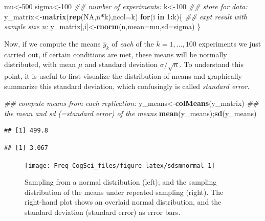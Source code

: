\documentclass[12pt,]{krantz}
\newenvironment{Shaded}{\begin{snugshade}}{\end{snugshade}}
\newcommand{\CommentTok}[1]{\textcolor[rgb]{0.56,0.35,0.01}{\textit{#1}}}
\newcommand{\ControlFlowTok}[1]{\textcolor[rgb]{0.13,0.29,0.53}{\textbf{#1}}}
\newcommand{\DataTypeTok}[1]{\textcolor[rgb]{0.13,0.29,0.53}{#1}}
\newcommand{\DecValTok}[1]{\textcolor[rgb]{0.00,0.00,0.81}{#1}}
\newcommand{\KeywordTok}[1]{\textcolor[rgb]{0.13,0.29,0.53}{\textbf{#1}}}
\newcommand{\NormalTok}[1]{#1}
\newcommand{\OperatorTok}[1]{\textcolor[rgb]{0.81,0.36,0.00}{\textbf{#1}}}
\newcommand{\OtherTok}[1]{\textcolor[rgb]{0.56,0.35,0.01}{#1}}
\begin{document}
\begin{Shaded}
\begin{Highlighting}[]
\NormalTok{mu<-}\DecValTok{500}
\NormalTok{sigma<-}\DecValTok{100}
\CommentTok{## number of experiments:}
\NormalTok{k<-}\DecValTok{100}
\CommentTok{## store for data:}
\NormalTok{y_matrix<-}\KeywordTok{matrix}\NormalTok{(}\KeywordTok{rep}\NormalTok{(}\OtherTok{NA}\NormalTok{,n}\OperatorTok{*}\NormalTok{k),}\DataTypeTok{ncol=}\NormalTok{k)}
\ControlFlowTok{for}\NormalTok{(i }\ControlFlowTok{in} \DecValTok{1}\OperatorTok{:}\NormalTok{k)\{}
  \CommentTok{## expt result with sample size n:}
\NormalTok{  y_matrix[,i]<-}\KeywordTok{rnorm}\NormalTok{(n,}\DataTypeTok{mean=}\NormalTok{mu,}\DataTypeTok{sd=}\NormalTok{sigma)}
\NormalTok{\}}
\end{Highlighting}
\end{Shaded}

Now, if we compute the means \(\bar{y}_k\) of \emph{each} of the \(k=1,\dots,100\) experiments we just carried out, if certain conditions are met, these means will be normally distributed, with mean \(\mu\) and standard deviation \(\sigma/\sqrt{n}\). To understand this point, it is useful to first visualize the distribution of means and graphically summarize this standard deviation, which confusingly is called \emph{standard error}.

\begin{Shaded}
\begin{Highlighting}[]
\CommentTok{## compute means from each replication:}
\NormalTok{y_means<-}\KeywordTok{colMeans}\NormalTok{(y_matrix)}
\CommentTok{## the mean and sd (=standard error) of the means}
\KeywordTok{mean}\NormalTok{(y_means);}\KeywordTok{sd}\NormalTok{(y_means)}
\end{Highlighting}
\end{Shaded}

\begin{verbatim}
## [1] 499.8
\end{verbatim}

\begin{verbatim}
## [1] 3.067
\end{verbatim}

\begin{figure}
\texttt{[image: Freq\_CogSci\_files/figure-latex/sdsmnormal-1]} \caption{Sampling from a normal distribution (left); and the sampling distribution of the means under repeated sampling (right). The right-hand plot shows an overlaid normal distribution, and the standard deviation (standard error) as error bars.}\label{fig:sdsmnormal}
\end{figure}
\end{document}
